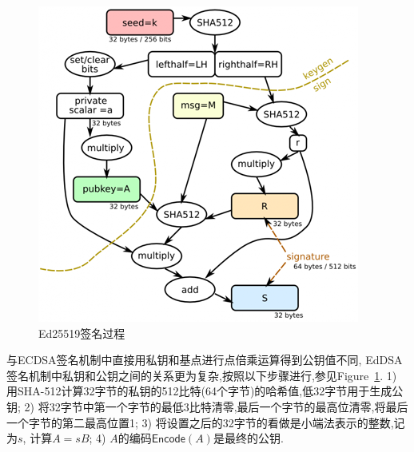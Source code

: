 \begin{figure}[h]
\centering
\includegraphics[width=.7\textwidth]{ed25519.png}
\caption{Ed25519签名过程}\label{fig-ed25519}
\end{figure}

与ECDSA签名机制中直接用私钥和基点进行点倍乘运算得到公钥值不同,
EdDSA签名机制中私钥和公钥之间的关系更为复杂,按照以下步骤进行,参见Figure~\ref{fig-ed25519}.
1) 用\textsf{SHA-512}计算32字节的私钥的512比特(64个字节)的哈希值,低32字节用于生成公钥;
2) 将32字节中第一个字节的最低3比特清零,最后一个字节的最高位清零,将最后一个字节的第二最高位置1;
3) 将设置之后的32字节的看做是小端法表示的整数,记为$s$, 计算$A = sB$;
4) $A$的编码$\textsf{Encode}(A)$是最终的公钥.



